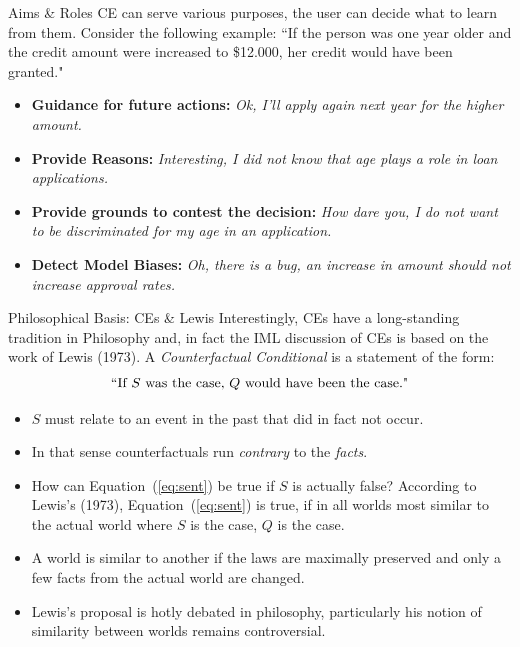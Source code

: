 \documentclass[11pt,compress,t,notes=noshow, xcolor=table]{beamer}
\begin{document}
\begin{vbframe}{Aims \& Roles}
	CE can serve various purposes, the user can decide what to learn from them. Consider the following example:\newline
	``If the person was one year older and the credit amount were increased to \$12.000, her credit would have been granted."  \\[0.2cm]
	\begin{itemize}
		\itemsep1.5em
		\item \textbf{Guidance for future actions:} \textit{Ok, I'll apply again next year for the higher amount.}
		\item \textbf{Provide Reasons:} \textit{Interesting, I did not know that age plays a role in loan applications.}
		\item \textbf{Provide grounds to contest the decision:} \textit{How dare you, I do not want to be discriminated for my age in an application.}
		\item \textbf{Detect Model Biases:} \textit{Oh, there is a bug, an increase in amount should not increase approval rates.}
	\end{itemize}
\end{vbframe}

\begin{vbframe}{Philosophical Basis: CEs \& Lewis}
Interestingly, CEs have a long-standing tradition in Philosophy and, in fact the IML discussion of CEs is based on the work of Lewis (1973). A \emph{Counterfactual Conditional} is a statement of the form:	
\begin{equation}
		\textnormal{``If $S$ was the case, $Q$ would have been the case."}
		\label{eq:sent}
\end{equation}
	\begin{itemize}
		\item $S$ must relate to an event in the past that did in fact not occur.
		\item In that sense counterfactuals run \emph{contrary} to the \emph{facts}.
		\item How can Equation~(\ref{eq:sent}) be true if $S$ is actually false? According to Lewis's (1973), Equation~(\ref{eq:sent}) is true, if in all worlds most similar to the actual world where $S$ is the case, $Q$ is the case. 
		\item A world is similar to another if the laws are maximally preserved and only a few facts from the actual world are changed.
		\item Lewis's proposal is hotly debated in philosophy, particularly his notion of similarity between worlds remains controversial. 
	\end{itemize}
\end{vbframe}
\end{document}
